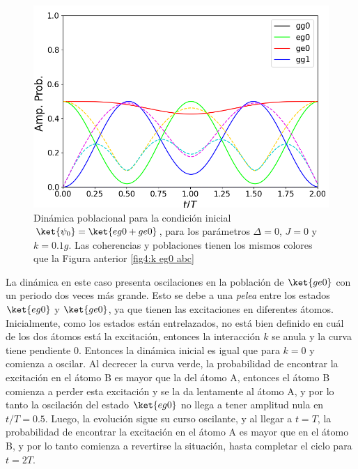 \begin{figure}[h]
    \begin{minipage}[c]{0.67\textwidth}
        \includegraphics[width=\textwidth]{figuras/ch4/k eg0+ ABC.png}
    \end{minipage}\hfill
    \begin{minipage}[c]{0.3\textwidth}
    \caption{Dinámica poblacional para la condición inicial $\ket{\psi_0}=\ket{eg0+ge0}$, para los parámetros $\Delta=0$, $J=0$ y $k=0.1g$. Las coherencias y poblaciones tienen los mismos colores que la Figura anterior \ref{fig4:k eg0 abc}}
    \label{fig4:k eg0 sim abc}
  \end{minipage}
\end{figure}
La dinámica en este caso presenta oscilaciones en la población de $\ket{ge0}$ con un periodo dos veces más grande. Esto se debe a una \textit{pelea} entre los estados $\ket{eg0}$ y $\ket{ge0}$, ya que tienen las excitaciones en diferentes átomos. Inicialmente, como los estados están entrelazados, no está bien definido en cuál de los dos átomos está la excitación, entonces la interacción $k$ se anula y la curva tiene pendiente 0. Entonces la dinámica inicial es igual que para $k=0$ y comienza a oscilar. Al decrecer la curva verde, la probabilidad de encontrar la excitación en el átomo B es mayor que la del átomo A, entonces el átomo B comienza a perder esta excitación y se la da lentamente al átomo A, y por lo tanto la oscilación del estado $\ket{eg0}$ no llega a tener amplitud nula en $t/T=0.5$. Luego, la evolución sigue su curso oscilante, y al llegar a $t=T$, la probabilidad de encontrar la excitación en el átomo A es mayor que en el átomo B, y por lo tanto comienza a revertirse la situación, hasta completar el ciclo para $t=2T$. 

